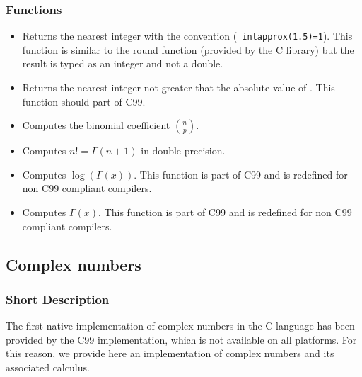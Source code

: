 \subsubsection{Functions}
\begin{itemize}
\item {}
  \sshortdescribe Returns the nearest integer with the convention ({\tt
    intapprox(1.5)=1}). This function is similar to the round function
  (provided by the C library) but the result is typed as an integer and not a
  double.

\item {}
  \sshortdescribe Returns the nearest integer not greater that the absolute
  value of . This function should part of C99.

\item {}
  \sshortdescribe Computes the binomial coefficient $\binom{n}{p}$.

\item {}
  \sshortdescribe Computes $n! = \Gamma(n+1)$ in double precision.

\item {}
  \sshortdescribe Computes $\log(\Gamma(x))$. This function is part of C99 and is
  redefined for non C99 compliant compilers.

\item {}
  \sshortdescribe Computes $\Gamma(x)$. This function is part of C99 and is
  redefined for non C99 compliant compilers.

\end{itemize}

\subsection{Complex numbers}
\subsubsection{Short Description}

The first native implementation of complex numbers in the C language has been
provided by the C99 implementation, which is not available on all
platforms. For this reason, we provide here an implementation of complex
numbers and its associated calculus.

